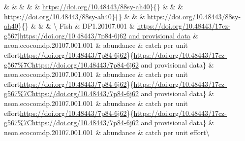 \documentclass[
  12pt,
]{article}
\begin{document}
 \&  \& \href{https://doi.org/10.48443/s730-dy13|https://doi.org/10.48443/88sy-ah40}{} \&  \&  \& \textbar{}\url{https://doi.org/10.48443/88sy-ah40}\}\{\} \&  \&  \& \textbar{}\url{https://doi.org/10.48443/88sy-ah40}\}\{\} \&  \&  \& \textbar{}\url{https://doi.org/10.48443/88sy-ah40}\}\{\} \&  \&  \& \textbackslash{}
Fish \& DP1.20107.001 \& \href{https://doi.org/10.48443/17cz-g567|https://doi.org/10.48443/7p84-6j62}{https://doi.org/10.48443/17cz-g567|https://doi.org/10.48443/7p84-6j62 and provisional data} \& neon.ecocomdp.20107.001.001 \& abundance \& catch per unit effort\textbar{}\url{https://doi.org/10.48443/7p84-6j62}\}\{\url{https://doi.org/10.48443/17cz-g567\%7Chttps://doi.org/10.48443/7p84-6j62} and provisional data\} \& neon.ecocomdp.20107.001.001 \& abundance \& catch per unit effort\textbar{}\url{https://doi.org/10.48443/7p84-6j62}\}\{\url{https://doi.org/10.48443/17cz-g567\%7Chttps://doi.org/10.48443/7p84-6j62} and provisional data\} \& neon.ecocomdp.20107.001.001 \& abundance \& catch per unit effort\textbar{}\url{https://doi.org/10.48443/7p84-6j62}\}\{\url{https://doi.org/10.48443/17cz-g567\%7Chttps://doi.org/10.48443/7p84-6j62} and provisional data\} \& neon.ecocomdp.20107.001.001 \& abundance \& catch per unit effort\textbackslash{}
\end{document}

